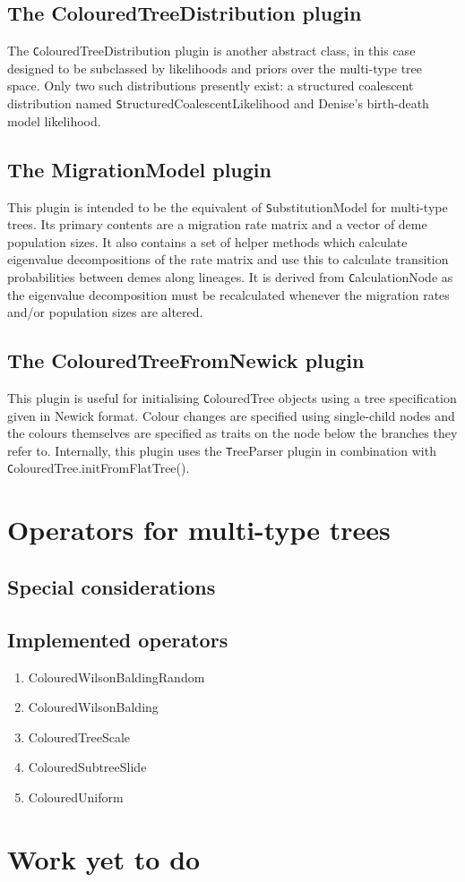 \documentclass[english]{article}
\newcommand{\class}[1]{{\texttt #1}}
\begin{document}
\subsection{The ColouredTreeDistribution plugin}

The \class{ColouredTreeDistribution} plugin is another abstract class,
in this case designed to be subclassed by likelihoods and priors over
the multi-type tree space.  Only two such distributions presently
exist: a structured coalescent distribution named
\class{StructuredCoalescentLikelihood} and Denise's birth-death model
likelihood.

\subsection{The MigrationModel plugin}

This plugin is intended to be the equivalent of
\class{SubstitutionModel} for multi-type trees. Its primary contents
are a migration rate matrix and a vector of deme population sizes. It
also contains a set of helper methods which calculate eigenvalue
decompositions of the rate matrix and use this to calculate transition
probabilities between demes along lineages. It is derived from
\class{CalculationNode} as the eigenvalue decomposition must be
recalculated whenever the migration rates and/or population sizes are
altered.


\subsection{The ColouredTreeFromNewick plugin}

This plugin is useful for initialising \class{ColouredTree} objects
using a tree specification given in Newick format.  Colour changes
are specified using single-child nodes and the colours themselves are
specified as traits on the node below the branches they refer to.
Internally, this plugin uses the \class{TreeParser} plugin in
combination with \class{ColouredTree.initFromFlatTree()}.

\section{Operators for multi-type trees}

\subsection{Special considerations}

\subsection{Implemented operators}

\begin{enumerate}
\item ColouredWilsonBaldingRandom
\item ColouredWilsonBalding
\item ColouredTreeScale
\item ColouredSubtreeSlide
\item ColouredUniform
\end{enumerate}


\section{Work yet to do}
\end{document}
